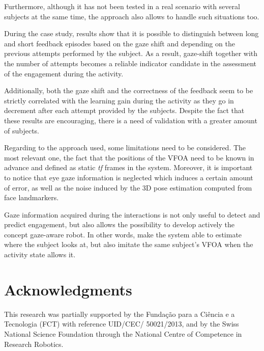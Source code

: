 \documentclass{sig-alternate}
\begin{document}
Furthermore, although it has not been tested in a real scenario with several subjects at the same time, the approach also allows to handle such situations too.

During the case study, results show that it is possible to distinguish between long and short feedback episodes based on the gaze shift and depending on the previous attempts performed by the subject. As a result, gaze-shift together with the number of attempts becomes a reliable indicator candidate in the assessment of the engagement during the activity.

Additionally, both the gaze shift and the correctness of the feedback seem to be strictly correlated with the learning gain during the activity as they go in decrement after each attempt provided by the subjects. Despite the fact that these results are encouraging, there is a need of validation with a greater amount of subjects.

Regarding to the approach used, some limitations need to be considered. The most relevant one, the fact that the positions of the VFOA need to be known in advance and defined as static \textit{tf} frames in the system. Moreover, it is important to notice that eye gaze information is neglected which induces a certain amount of error, as well as the noise induced by the 3D pose estimation computed from face landmarkers.

Gaze information acquired during the interactions is not only useful to detect and predict engagement, but also allows the possibility to develop actively the concept gaze-aware robot. In other words, make the system able to estimate where the subject looks at, but also imitate the same subject's VFOA when the activity state allows it. 

\section*{Acknowledgments}
This research was partially supported by the Funda\c{c}\~{a}o para a Ci\^{e}ncia
e a Tecnologia (FCT) with reference UID/CEC/ 50021/2013, and by the Swiss
National Science Foundation through the National Centre of Competence in
Research Robotics.



\end{document}
